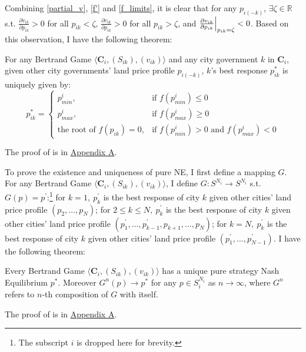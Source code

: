 Combining \eqref{partial_v}, \eqref{f'} and \eqref{f_limits}, it is clear that
for any $p_{i(-k)}$,
$\exists \zeta \in \mathbb{R}$ s.t. $\frac{\partial v_{ik}}{\partial p_{ik}} > 0$
for all $p_{ik} < \zeta$,  $\frac{\partial v_{ik}}{\partial p_{ik}} > 0$
for all $p_{ik} > \zeta$,
and $\evalat[\Big]{\frac{\partial v_{ik}}{\partial p_{ik}}}{p_{ik}=\zeta} < 0$.
Based on this observation, I have the following theorem:
\begin{thm}
    \label{uniqueness_best_response}
    For any Bertrand Game $\langle \mathbf{C}_{i}, (S_{ik}), (v_{ik}) \rangle$
    and any city government $k$ in $\mathbf{C}_i$,
    given other city governments' land price profile $p_{i(-k)}$, $k$'s best response
    $p^*_{ik}$ is uniquely given by:
    \begin{equation}
        p^*_{ik}  = \begin{cases}
            p^{i}_{min}, & \text{if $f(p^{i}_{min}) \leq 0$}                   \\
            p^{i}_{max}, & \text{if $f(p^{i}_{max}) \geq 0$}                   \\
            \text{the root of $f(p_{ik}) = 0$},
                         & \text{if $f(p^{i}_{min})>0$ and $f(p^{i}_{max})<0$}
        \end{cases}
    \end{equation}
\end{thm}
The proof of  is in
\hyperref[sec:proofs]{Appendix A}.

To prove the existence and uniqueness of pure NE, I first define a mapping $G$.
For any Bertrand Game $\langle \mathbf{C}_{i}, (S_{ik}), (v_{ik}) \rangle$,
I define $G: S^{N_i} \rightarrow S^{N_i}$ s.t.
$G(p) = p^{\prime}$:\footnote{
    The subscript $i$ is dropped here for brevity.
}
for $k = 1,~ p^{\prime}_{k}$ is the best response of city $k$ given
other cities' land price profile $(p_2, \dots, p_N)$;
for $2 \leq k \leq N, ~  p^{\prime}_k$ is the best response of city $k$ given
other cities' land price profile
$(p^{\prime}_1, \dots, p^{\prime}_{k - 1}, p_{k + 1}, \dots, p_{N})$;
for $k = N, ~  p^{\prime}_k$ is the best response of city $k$ given
other cities' land price profile
$(p^{\prime}_1, \dots, p^{\prime}_{N - 1})$.
I have the following theorem:

\begin{thm}
    \label{unique_ne}
    Every Bertrand Game $\langle \mathbf{C}_{i}, (S_{ik}), (v_{ik}) \rangle$ has a unique
    pure strategy Nash Equilibrium $p^{*}$.
    Moreover  $G^{n}(p) \rightarrow p^{*}$ for any $p \in S_{i}^{N_i}$ as $n \rightarrow \infty$,
    where $G^{n}$ refers to $n$-th composition of $G$ with itself.
\end{thm}
The proof of  is in
\hyperref[sec:proofs]{Appendix A}.




